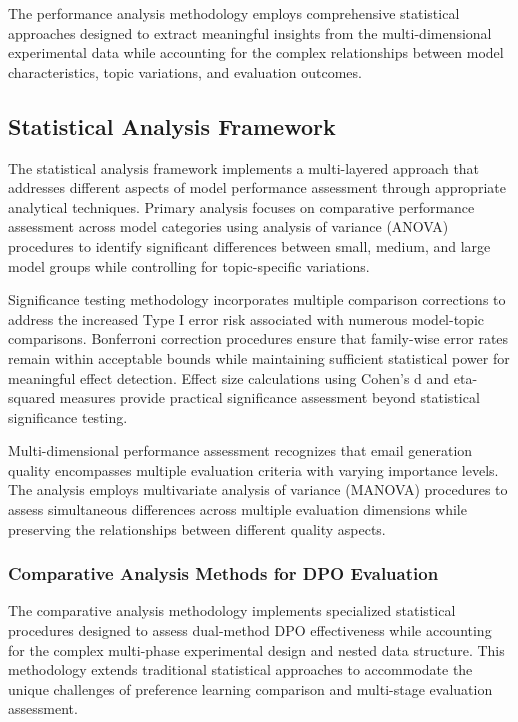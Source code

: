 The performance analysis methodology employs comprehensive statistical approaches designed to extract meaningful insights from the multi-dimensional experimental data while accounting for the complex relationships between model characteristics, topic variations, and evaluation outcomes.

\subsection{Statistical Analysis Framework}

The statistical analysis framework implements a multi-layered approach that addresses different aspects of model performance assessment through appropriate analytical techniques. Primary analysis focuses on comparative performance assessment across model categories using analysis of variance (ANOVA) procedures to identify significant differences between small, medium, and large model groups while controlling for topic-specific variations.

Significance testing methodology incorporates multiple comparison corrections to address the increased Type I error risk associated with numerous model-topic comparisons. Bonferroni correction procedures ensure that family-wise error rates remain within acceptable bounds while maintaining sufficient statistical power for meaningful effect detection. Effect size calculations using Cohen's d and eta-squared measures provide practical significance assessment beyond statistical significance testing.

Multi-dimensional performance assessment recognizes that email generation quality encompasses multiple evaluation criteria with varying importance levels. The analysis employs multivariate analysis of variance (MANOVA) procedures to assess simultaneous differences across multiple evaluation dimensions while preserving the relationships between different quality aspects.

\subsubsection{Comparative Analysis Methods for DPO Evaluation}

The comparative analysis methodology implements specialized statistical procedures designed to assess dual-method DPO effectiveness while accounting for the complex multi-phase experimental design and nested data structure. This methodology extends traditional statistical approaches to accommodate the unique challenges of preference learning comparison and multi-stage evaluation assessment.

